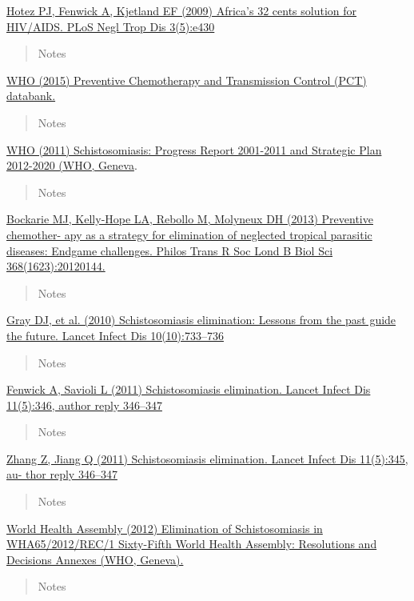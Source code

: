 \documentclass[10,portrait]{article}
\begin{document}
\href{}{Hotez PJ, Fenwick A, Kjetland EF (2009) Africa's 32 cents
solution for HIV/AIDS. PLoS Negl Trop Dis 3(5):e430}

\begin{quote}
Notes
\end{quote}

\href{www.who.int/neglected_diseases/preventive_chemotherapy/databank/}{WHO
(2015) Preventive Chemotherapy and Transmission Control (PCT) databank.}

\begin{quote}
Notes
\end{quote}

\href{}{WHO (2011) Schistosomiasis: Progress Report 2001-2011 and
Strategic Plan 2012-2020 (WHO, Geneva}.

\begin{quote}
Notes
\end{quote}

\href{}{Bockarie MJ, Kelly-Hope LA, Rebollo M, Molyneux DH (2013)
Preventive chemother- apy as a strategy for elimination of neglected
tropical parasitic diseases: Endgame challenges. Philos Trans R Soc Lond
B Biol Sci 368(1623):20120144.}

\begin{quote}
Notes
\end{quote}

\href{}{Gray DJ, et al. (2010) Schistosomiasis elimination: Lessons from
the past guide the future. Lancet Infect Dis 10(10):733--736}

\begin{quote}
Notes
\end{quote}

\href{}{Fenwick A, Savioli L (2011) Schistosomiasis elimination. Lancet
Infect Dis 11(5):346, author reply 346--347}

\begin{quote}
Notes
\end{quote}

\href{}{Zhang Z, Jiang Q (2011) Schistosomiasis elimination. Lancet
Infect Dis 11(5):345, au- thor reply 346--347}

\begin{quote}
Notes
\end{quote}

\href{}{World Health Assembly (2012) Elimination of Schistosomiasis in
WHA65/2012/REC/1 Sixty-Fifth World Health Assembly: Resolutions and
Decisions Annexes (WHO, Geneva).}

\begin{quote}
Notes
\end{quote}
\end{document}
